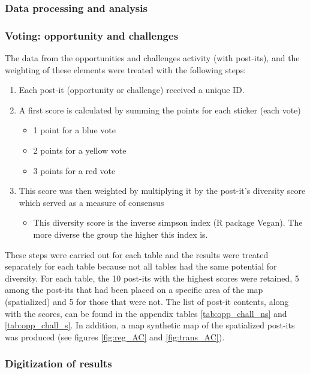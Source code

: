 \subsubsection{Data processing and analysis}

\subsubsection*{Voting: opportunity and challenges}

The data from the opportunities and challenges activity (with post-its), and the weighting of these elements were treated with the following steps:
\begin{enumerate}
  \item Each post-it (opportunity or challenge) received a unique ID.
  \item A first score is calculated by summing the points for each sticker (each vote)
  \begin{itemize}
      \item 1 point for a blue vote
      \item 2 points for a yellow vote
      \item 3 points for a red vote
  \end{itemize}
  \item This score was then weighted by multiplying it by the post-it’s diversity score which served as a measure of consensus
\begin{itemize}
\item This diversity score is the inverse simpson index (R package Vegan). The more diverse the group the higher this index is.
\end{itemize}
\end{enumerate}
These steps were carried out for each table and the results were treated separately for each table because not all tables had the same potential for diversity. For each table, the 10 post-its with the highest scores were retained, 5 among the post-its that had been placed on a specific area of the map (spatialized) and 5 for those that were not. The list of post-it contents, along with the scores, can be found in the appendix tables \ref{tab:opp_chall_ns} and \ref{tab:opp_chall_s}. In addition, a map synthetic map of the spatialized post-its was produced (see figures \ref{fig:reg_AC} and \ref{fig:trans_AC}).\\

\subsubsection*{Digitization of results}

